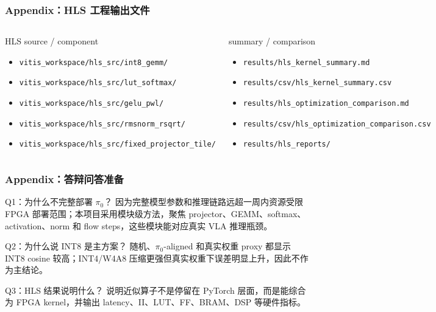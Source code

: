 \documentclass[10pt, aspectratio=169]{beamer}
\newcommand{\piZero}{\texorpdfstring{$\pi_0$}{pi0}\xspace}
\begin{document}
\begin{frame}
  \frametitle{Appendix：HLS 工程输出文件}
  \scriptsize
  \begin{columns}[T,onlytextwidth]
    \begin{block}{HLS source / component}
      \begin{itemize}
        \item \texttt{vitis\_workspace/hls\_src/int8\_gemm/}
        \item \texttt{vitis\_workspace/hls\_src/lut\_softmax/}
        \item \texttt{vitis\_workspace/hls\_src/gelu\_pwl/}
        \item \texttt{vitis\_workspace/hls\_src/rmsnorm\_rsqrt/}
        \item \texttt{vitis\_workspace/hls\_src/fixed\_projector\_tile/}
      \end{itemize}
    \end{block}

    \begin{alertblock}{summary / comparison}
      \begin{itemize}
        \item \texttt{results/hls\_kernel\_summary.md}
        \item \texttt{results/csv/hls\_kernel\_summary.csv}
        \item \texttt{results/hls\_optimization\_comparison.md}
        \item \texttt{results/csv/hls\_optimization\_comparison.csv}
        \item \texttt{results/hls\_reports/}
      \end{itemize}
    \end{alertblock}
  \end{columns}
\end{frame}

\begin{frame}
  \frametitle{Appendix：答辩问答准备}
  \small
  \begin{block}{Q1：为什么不完整部署 \piZero？}
    \footnotesize
    因为完整模型参数和推理链路远超一周内资源受限 FPGA 部署范围；本项目采用模块级方法，聚焦 projector、GEMM、softmax、activation、norm 和 flow steps，这些模块能对应真实 VLA 推理瓶颈。
  \end{block}

  \begin{block}{Q2：为什么说 INT8 是主方案？}
    \footnotesize
    随机、\piZero-aligned 和真实权重 proxy 都显示 INT8 cosine 较高；INT4/W4A8 压缩更强但真实权重下误差明显上升，因此不作为主结论。
  \end{block}

  \begin{block}{Q3：HLS 结果说明什么？}
    \footnotesize
    说明近似算子不是停留在 PyTorch 层面，而是能综合为 FPGA kernel，并输出 latency、II、LUT、FF、BRAM、DSP 等硬件指标。
  \end{block}
\end{frame}
\end{document}
